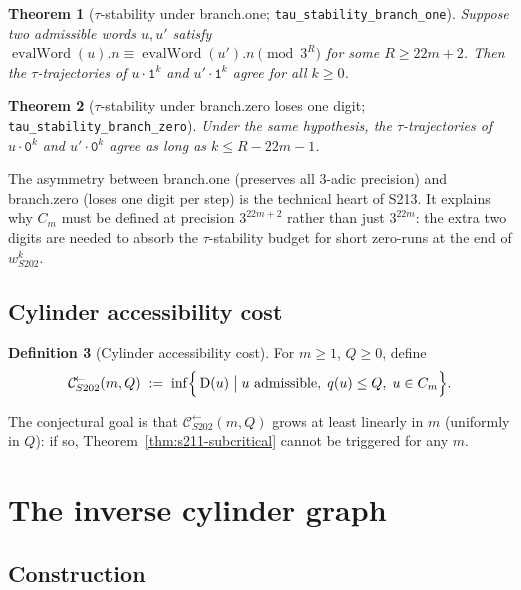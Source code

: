 \documentclass[11pt,a4paper]{article}
\theoremstyle{plain}
\newtheorem{theorem}{Theorem}[section]
\theoremstyle{definition}
\newtheorem{definition}[theorem]{Definition}
\newcommand{\wS}{w_{S202}}
\newcommand{\defect}{\mathrm{D}}
\newcommand{\Cback}{\mathcal{C}^{\!\leftarrow}_{S202}}
\DeclareMathOperator{\evalWord}{evalWord}
\begin{document}
\begin{theorem}[$\tau$-stability under branch.one;
\texttt{tau\_stability\_branch\_one}]
\label{thm:tau-stability}
Suppose two admissible words $u, u'$ satisfy
$\evalWord(u).n \equiv \evalWord(u').n \pmod{3^{R}}$ for some
$R \ge 22m + 2$. Then the $\tau$-trajectories of $u \cdot \mathtt{1}^k$
and $u' \cdot \mathtt{1}^k$ agree for all $k \ge 0$.
\end{theorem}

\begin{theorem}[$\tau$-stability under branch.zero loses one digit;
\texttt{tau\_stability\_branch\_zero}]
\label{thm:tau-stability-zero}
Under the same hypothesis, the $\tau$-trajectories of
$u \cdot \mathtt{0}^k$ and $u' \cdot \mathtt{0}^k$ agree as long
as $k \le R - 22m - 1$.
\end{theorem}

The asymmetry between branch.one (preserves all 3-adic precision)
and branch.zero (loses one digit per step) is the technical heart
of S213. It explains why $C_m$ must be defined at precision
$3^{22m + 2}$ rather than just $3^{22m}$: the extra two digits
are needed to absorb the $\tau$-stability budget for short
zero-runs at the end of $\wS^k$.

\subsection{Cylinder accessibility cost}

\begin{definition}[Cylinder accessibility cost]
\label{def:Cback}
For $m \ge 1$, $Q \ge 0$, define
\[
  \Cback(m, Q) \;:=\;
  \inf \Bigl\{ \, \defect(u) \;\big|\;
       u \text{ admissible}, \;
       q(u) \le Q, \;
       u \in C_m
  \Bigr\}.
\]
\end{definition}

\noindent The conjectural goal is that $\Cback(m, Q)$ grows at least
linearly in $m$ (uniformly in $Q$): if so,
Theorem~\ref{thm:s211-subcritical} cannot be triggered for any $m$.

\section{The inverse cylinder graph}\label{sec:inverse-graph}

\subsection{Construction}
\end{document}

